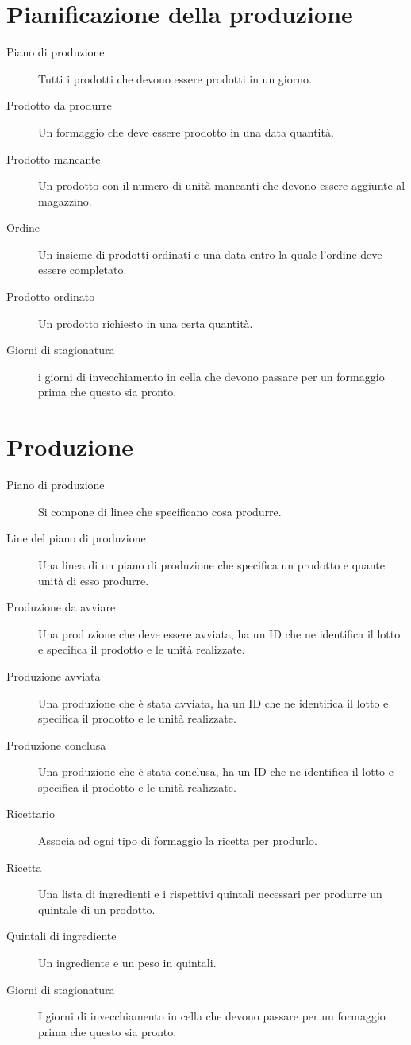 \section{Pianificazione della produzione}
\begin{description}
    \item [Piano di produzione] Tutti i prodotti che devono essere prodotti in un giorno.
    \item [Prodotto da produrre] Un formaggio che deve essere prodotto in una data quantità.
    \item [Prodotto mancante] Un prodotto con il numero di unità mancanti che devono essere aggiunte al magazzino.
    \item [Ordine] Un insieme di prodotti ordinati e una data entro la quale l'ordine deve essere completato.
    \item [Prodotto ordinato] Un prodotto richiesto in una certa quantità.
    \item [Giorni di stagionatura] i giorni di invecchiamento in cella che devono passare per un formaggio prima che questo sia pronto.
\end{description}

\section{Produzione}
\begin{description}
    \item [Piano di produzione] Si compone di linee che specificano cosa produrre.
    \item [Line del piano di produzione] Una linea di un piano di produzione che specifica un prodotto e quante unità di esso produrre.
    \item [Produzione da avviare] Una produzione che deve essere avviata, ha un ID che ne identifica il lotto e specifica il prodotto e le unità realizzate.
    \item [Produzione avviata] Una produzione che è stata avviata, ha un ID che ne identifica il lotto e specifica il prodotto e le unità realizzate.
    \item [Produzione conclusa] Una produzione che è stata conclusa, ha un ID che ne identifica il lotto e specifica il prodotto e le unità realizzate.
    \item [Ricettario] Associa ad ogni tipo di formaggio la ricetta per produrlo.
    \item [Ricetta] Una lista di ingredienti e i rispettivi quintali necessari per produrre un quintale di un prodotto.
    \item [Quintali di ingrediente] Un ingrediente e un peso in quintali.
    \item [Giorni di stagionatura] I giorni di invecchiamento in cella che devono passare per un formaggio prima che questo sia pronto.
\end{description}

